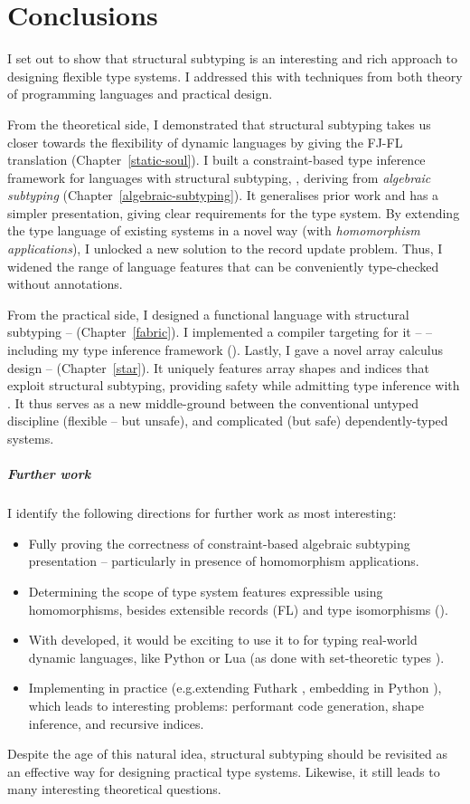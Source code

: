\chapter{Conclusions}
\label{conclusions}

I set out to show that structural subtyping is an interesting and rich approach to designing flexible type systems. I addressed this with techniques from both theory of programming languages and practical design.

From the theoretical side, I demonstrated that structural subtyping takes us closer towards the flexibility of dynamic languages by giving the FJ-FL translation (Chapter~\ref{static-soul}). 
I built a constraint-based type inference framework for languages with structural subtyping, \textbf{\inference{}}, deriving from \emph{algebraic subtyping} (Chapter~\ref{algebraic-subtyping}). 
It generalises prior work and has a simpler presentation, giving clear requirements for the type system.
By extending the type language of existing systems in a novel way (with \emph{homomorphism applications}), I unlocked a new solution to the record update problem. 
Thus, I widened the range of language features that can be conveniently type-checked without annotations.

From the practical side, I designed a functional language with structural subtyping -- \textbf{\fabric} (Chapter~\ref{fabric}). 
I implemented a compiler targeting \wasm{} for it -- \compiler{} -- including my type inference framework (\inference{}).
Lastly, I gave a novel array calculus design -- \textbf{\starr{}} (Chapter~\ref{star}). It uniquely features array shapes and indices that exploit structural subtyping, providing safety while admitting type inference with \inference{}. It thus serves as a new middle-ground between the conventional untyped discipline (flexible -- but unsafe), and complicated (but safe) dependently-typed systems. 

\paragraph{Further work} I identify the following directions for further work as most interesting: \begin{itemize}
    \item Fully proving the correctness of constraint-based algebraic subtyping presentation -- particularly in presence of homomorphism applications. 
    \item Determining the scope of type system features expressible using homomorphisms, besides extensible records (FL) and type isomorphisms (\starr{}).
    \item With \inference{} developed, it would be exciting to use it to for typing real-world dynamic languages, like Python or Lua (as done with set-theoretic types \cite{set-theoretic-types-for-elixir, set-theoretic-types-for-erlang, castagna-dynamic}).
    \item Implementing \starr{} in practice (e.g.\@ extending Futhark \cite{futhark}, embedding in Python \cite{ein}), which leads to interesting problems: performant code generation, shape inference, and recursive indices.
\end{itemize}

Despite the age of this natural idea, structural subtyping should be revisited as an effective way for designing practical type systems. Likewise, it still leads to many interesting theoretical questions.
